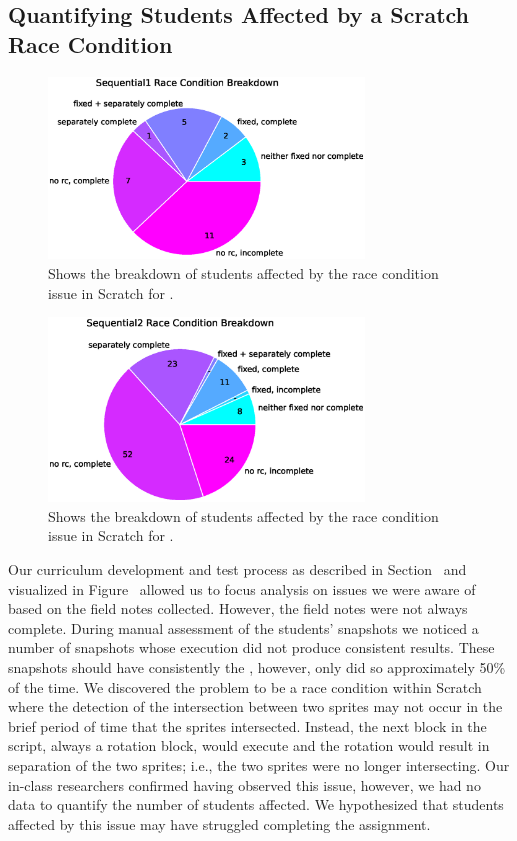 \subsection{Quantifying Students Affected by a Scratch Race Condition}

\begin{figure}[!t]
\centering \includegraphics[width=3.3in]{graphs/race_condition_Sequential1.eps}
\caption{Shows the breakdown of students affected by the race condition issue
  in Scratch for \sone{}.}
\end{figure}

\begin{figure}[!t]
\centering \includegraphics[width=3.3in]{graphs/race_condition_Sequential2.eps}
\caption{Shows the breakdown of students affected by the race condition issue
  in Scratch for \stwo{}.}
\end{figure}

Our curriculum development and test process as described in
Section~ and visualized in Figure~
allowed us to focus analysis on issues we were aware of based on the field
notes collected. However, the field notes were not always complete. During
manual assessment of the students' snapshots we noticed a number of snapshots
whose execution did not produce consistent results. These snapshots should have
consistently \caught{} the \zebra{}, however, only did so approximately 50\% of
the time. We discovered the problem to be a race condition within Scratch where
the detection of the intersection between two sprites may not occur in the
brief period of time that the sprites intersected. Instead, the next block in
the script, always a rotation block, would execute and the rotation would
result in separation of the two sprites; i.e., the two sprites were no longer
intersecting. Our in-class researchers confirmed having observed this issue,
however, we had no data to quantify the number of students affected. We
hypothesized that students affected by this issue may have struggled completing
the assignment.

